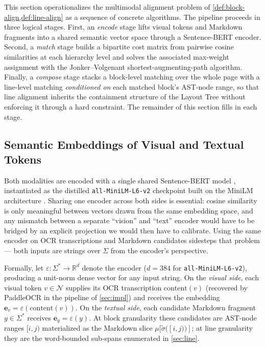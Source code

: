 \documentclass{article}
\theoremstyle{definition}
\newcommand{\Nodes}{\mathcal{N}}
\begin{document}
This section operationalizes the multimodal alignment problem of
\cref{def:block-align,def:line-align} as a sequence of concrete
algorithms.  The pipeline proceeds in three logical stages.  First,
an \emph{encode} stage lifts visual tokens and Markdown fragments into
a shared semantic vector space through a Sentence-BERT encoder.
Second, a \emph{match} stage builds a bipartite cost matrix from
pairwise cosine similarities at each hierarchy level and solves the
associated max-weight assignment with the Jonker--Volgenant
shortest-augmenting-path algorithm.  Finally, a \emph{compose} stage
stacks a block-level matching over the whole page with a line-level
matching \emph{conditioned on} each matched block's AST-node range,
so that line alignment inherits the containment structure of the
Layout Tree without enforcing it through a hard constraint.  The
remainder of this section fills in each stage.

\subsection{Semantic Embeddings of Visual and Textual Tokens}
\label{sec:emb}

Both modalities are encoded with a single shared Sentence-BERT
model \cite{reimers2019sbert}, instantiated as the distilled
\texttt{all-MiniLM-L6-v2} checkpoint built on the MiniLM architecture
\cite{wang2020minilm}.  Sharing one encoder across both sides is
essential: cosine similarity is only meaningful between vectors drawn
from the same embedding space, and any mismatch between a separate
``vision'' and ``text'' encoder would have to be bridged by an
explicit projection we would then have to calibrate.  Using the same
encoder on OCR transcriptions and Markdown candidates sidesteps that
problem --- both inputs are strings over $\Sigma$ from the encoder's
perspective.

Formally, let $\varepsilon : \Sigma^{*} \to \mathbb{R}^{d}$ denote
the encoder ($d = 384$ for \texttt{all-MiniLM-L6-v2}), producing a
unit-norm dense vector for any input string.  On the \emph{visual
      side}, each visual token $v \in \Nodes$ supplies its OCR
transcription $\mathrm{content}(v)$ (recovered by PaddleOCR in the
pipeline of \cref{sec:impl}) and receives the embedding
$\mathbf{e}_v = \varepsilon(\mathrm{content}(v))$.  On the
\emph{textual side}, each candidate Markdown fragment
$y \in \Sigma^{*}$ receives $\mathbf{e}_y = \varepsilon(y)$.  At
block granularity these candidates are AST-node ranges $[i, j)$
materialized as the Markdown slice
$\mu[\widetilde{\sigma}([i, j))]$; at line granularity they are the
word-bounded sub-spans enumerated in \cref{sec:line}.
\end{document}
